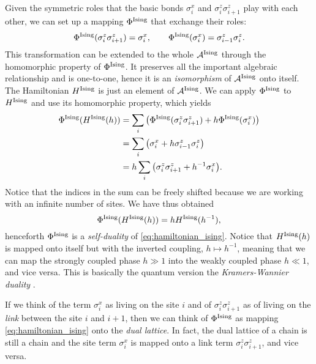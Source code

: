 Given the symmetric roles that the basic bonds $\sigma^x_i$ and $\sigma^z_i \sigma^z_{i+1}$ play with each other, we can set up a mapping $\Phi^{\text{Ising}}$ that exchange their roles:
\begin{equation}
    \Phi^{\text{Ising}}(\sigma^z_i \sigma^z_{i+1}) = \sigma^x_i, \qquad
    \Phi^{\text{Ising}}(\sigma^x_i) = \sigma^z_{i-1} \sigma^z_{i}.
    \label{eq:duality_ising}
\end{equation}
This transformation can be extended to the whole $\mathcal{A}^{\text{Ising}}$ through the homomorphic property of $\Phi^{\text{Ising}}$.
It preserves all the important algebraic relationship and is one-to-one, hence it is an \emph{isomorphism} of $\mathcal{A}^{\text{Ising}}$ onto itself.
The Hamiltonian $H^{\text{Ising}}$ is just an element of $\mathcal{A}^{\text{Ising}}$.
We can apply $\Phi^{\text{Ising}}$ to $H^{\text{Ising}}$ and use its homomorphic property, which yields
\begin{equation}
    \begin{split}
        \Phi^{\ising}( \HamilIsing(h) )
        & = \sum_{i} \pqty{ \Phi^{\ising} (\sigma^z_i \sigma^z_{i+1}) + h \Phi^{\ising}(\sigma^x_i)} \\
        & = \sum_{i} \pqty{ \sigma^x_i + h \sigma^z_{i-1} \sigma^z_{i}} \\
        & = h \sum_{i} \pqty{ \sigma^z_i \sigma^z_{i+1} + h^{-1} \sigma^x_i}.
    \end{split}
\end{equation}
Notice that the indices in the sum can be freely shifted because we are working with an infinite number of sites.
We have thus obtained
\begin{equation}
    \Phi^{\text{Ising}} (H^{\text{Ising}}(h)) = h H^{\text{Ising}}(h^{-1}),
\end{equation}
henceforth $\Phi^{\text{Ising}}$ is a \emph{self-duality} of \eqref{eq:hamiltonian_ising}.
Notice that $H^{\text{Ising}}(h)$ is mapped onto itself but with the inverted coupling, $h \mapsto h^{-1}$, meaning that we can map the strongly coupled phase $h \gg 1$ into the weakly coupled phase $h \ll 1$, and vice versa.
This is basically the quantum version the \emph{Kramers-Wannier duality} \cite{kramers1941statistics, fradkin1978order}.

If we think of the term $\sigma^x_i$ as living on the site $i$ and of $\sigma^z_i \sigma^z_{i+1}$ as of living on the \emph{link} between the site $i$ and $i+1$, then we can think of $\Phi^{\text{Ising}}$ as mapping \eqref{eq:hamiltonian_ising} onto the \emph{dual lattice}.
In fact, the dual lattice of a chain is still a chain and the site term $\sigma^x_i$ is mapped onto a link term $\sigma^z_i \sigma^z_{i+1}$, and vice versa.


